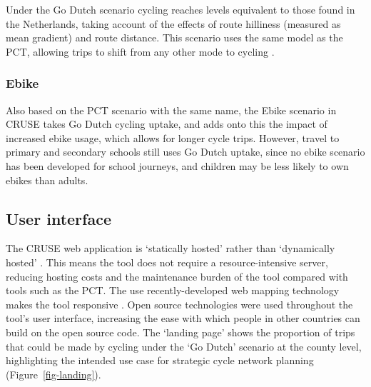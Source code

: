 \documentclass[
  super,
  preprint,
  3p]{elsarticle}
\begin{document}
Under the Go Dutch scenario cycling reaches levels equivalent to those
found in the Netherlands, taking account of the effects of route
hilliness (measured as mean gradient) and route distance. This scenario
uses the same model as the PCT, allowing trips to shift from any other
mode to cycling \citep{lovelace2017}.

\subsubsection{Ebike}\label{ebike}

Also based on the PCT scenario with the same name, the Ebike scenario in
CRUSE takes Go Dutch cycling uptake, and adds onto this the impact of
increased ebike usage, which allows for longer cycle trips. However,
travel to primary and secondary schools still uses Go Dutch uptake,
since no ebike scenario has been developed for school journeys, and
children may be less likely to own ebikes than adults.

\subsection{User interface}\label{sec-ui}

The CRUSE web application is `statically hosted' rather than
`dynamically hosted' \citep{wickham2021}. This means the tool does not
require a resource-intensive server, reducing hosting costs and the
maintenance burden of the tool compared with tools such as the PCT. The
use recently-developed web mapping technology makes the tool responsive
\citep{gonçalves2023}. Open source technologies were used throughout the
tool's user interface, increasing the ease with which people in other
countries can build on the open source code. The `landing page' shows
the proportion of trips that could be made by cycling under the `Go
Dutch' scenario at the county level, highlighting the intended use case
for strategic cycle network planning (Figure~\ref{fig-landing}).
\end{document}
